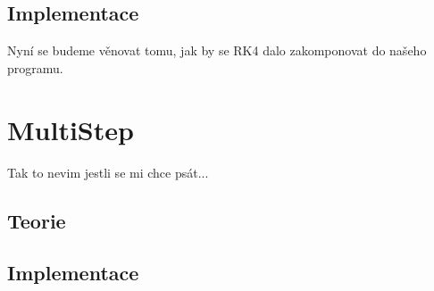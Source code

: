 \subsection{Implementace}
Nyní se budeme věnovat tomu, jak by se RK4 dalo zakomponovat do našeho programu.
\section{MultiStep}
\label{sec:implMultiStep}
Tak to nevim jestli se mi chce psát...
\subsection{Teorie}
\subsection{Implementace}